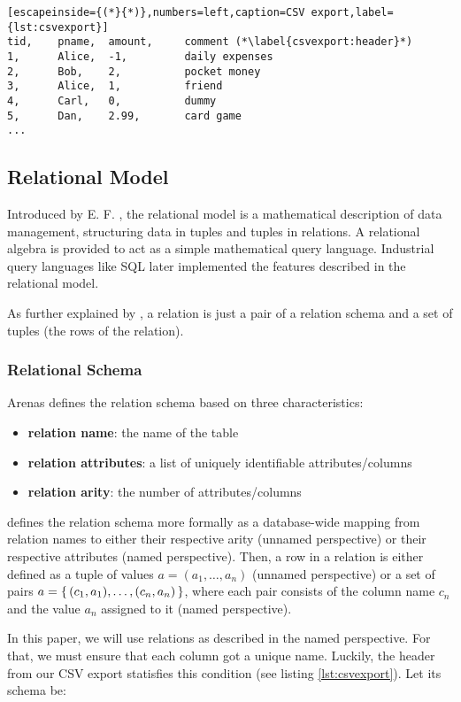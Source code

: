 \begin{lstlisting}[escapeinside={(*}{*)},numbers=left,caption=CSV export,label={lst:csvexport}]
tid,    pname,  amount,     comment (*\label{csvexport:header}*)
1,      Alice,  -1,         daily expenses
2,      Bob,    2,          pocket money
3,      Alice,  1,          friend
4,      Carl,   0,          dummy
5,      Dan,    2.99,       card game
...
\end{lstlisting}


\subsection{Relational Model}

Introduced by E. F. \cite{Codd70}, the relational model is a mathematical
description of data management, structuring data in tuples and tuples
in relations. A relational algebra is provided to act as a simple
mathematical query language. Industrial query languages
like SQL later implemented the features described in the relational model.

As further explained by \cite{Aren22}, a relation
is just a pair of a relation schema and a set of tuples (the rows of the relation).

\subsubsection{Relational Schema}
Arenas defines the relation schema based on three characteristics:
\begin{itemize}
    \item \textbf{relation name}: the name of the table
    \item \textbf{relation attributes}: a list of uniquely identifiable attributes/columns
    \item \textbf{relation arity}: the number of attributes/columns
\end{itemize}
\cite{Schw10} defines the relation schema more formally as a database-wide mapping
from relation names to either their respective arity (unnamed perspective) or
their respective attributes (named perspective). Then, a row in a relation
is either defined as a tuple of values $a = (a_1,\dots, a_n)$ (unnamed perspective) or
a set of pairs $a = \set{(c_1, a_1),\dots, (c_n, a_n)}$, where each pair consists of
the column name $c_n$ and the value $a_n$ assigned to it (named perspective).

In this paper, we will use relations as described in the named perspective.
For that, we must ensure that each column
got a unique name. Luckily, the header from our CSV export statisfies this condition
(see listing \ref{lst:csvexport}). Let its schema be:

